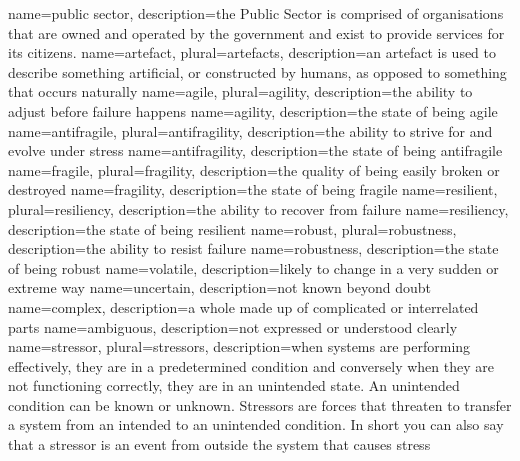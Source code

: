 {
	name={public sector},
	description={the Public Sector is comprised of organisations that are owned and operated by the government and exist to provide services for its citizens.}
}
{
	name={artefact},
	plural={artefacts},
	description={an artefact is used to describe something artificial, or constructed by humans, as opposed to something that occurs naturally}
}
{
	name=agile,
	plural={agility},
	description={the ability to adjust before failure happens}
}
{
	name={agility},
	description={the state of being agile}
}
{
	name={antifragile},
	plural={antifragility},
	description={the ability to strive for and evolve under stress}
}
{
	name={antifragility},
	description={the state of being antifragile}
}
{
	name=fragile,
	plural={fragility},
	description={the quality of being easily broken or destroyed}
}
{
	name={fragility},
	description={the state of being fragile}
}
{
	name=resilient,
	plural={resiliency},
	description={the ability to recover from failure}
}
{
	name={resiliency},
	description={the state of being resilient}
}
{
	name=robust,
	plural={robustness},
	description={the ability to resist failure}
}
{
	name={robustness},
	description={the state of being robust}
}
{
	name={volatile},
	description={likely to change in a very sudden or extreme way}
}
{
	name=uncertain,
	description={not known beyond doubt}
}
{
	name=complex,
	description={a whole made up of complicated or interrelated parts}
}
{
	name=ambiguous,
	description={not expressed or understood clearly}
}
{
	name={stressor},
	plural={stressors},
	description={when systems are performing effectively, they are in a predetermined condition and conversely when they are not functioning correctly, they are in an unintended state. An unintended condition can be known or unknown. Stressors are forces that threaten to transfer a system from an intended to an unintended condition. In short you can also say that a stressor is an event from outside the system that causes stress}
}

